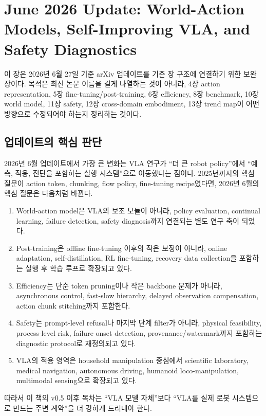 \chapter{June 2026 Update: World-Action Models, Self-Improving VLA, and Safety Diagnostics}
\label{ch:june_2026_update}

이 장은 2026년 6월 27일 기준 arXiv 업데이트를 기존 장 구조에 연결하기 위한 보완 장이다. 목적은 최신 논문 이름을 길게 나열하는 것이 아니라, 4장 action representation, 5장 fine-tuning/post-training, 6장 efficiency, 8장 benchmark, 10장 world model, 11장 safety, 12장 cross-domain embodiment, 13장 trend map이 어떤 방향으로 수정되어야 하는지 정리하는 것이다.

\section{업데이트의 핵심 판단}

2026년 6월 업데이트에서 가장 큰 변화는 VLA 연구가 ``더 큰 robot policy''에서 ``예측, 적응, 진단을 포함하는 실행 시스템''으로 이동했다는 점이다. 2025년까지의 핵심 질문이 action token, chunking, flow policy, fine-tuning recipe였다면, 2026년 6월의 핵심 질문은 다음처럼 바뀐다.

\begin{enumerate}
  \item World-action model은 VLA의 보조 모듈이 아니라, policy evaluation, continual learning, failure detection, safety diagnosis까지 연결되는 별도 연구 축이 되었다.
  \item Post-training은 offline fine-tuning 이후의 작은 보정이 아니라, online adaptation, self-distillation, RL fine-tuning, recovery data collection을 포함하는 실행 후 학습 루프로 확장되고 있다.
  \item Efficiency는 단순 token pruning이나 작은 backbone 문제가 아니라, asynchronous control, fast-slow hierarchy, delayed observation compensation, action chunk stitching까지 포함한다.
  \item Safety는 prompt-level refusal나 마지막 단계 filter가 아니라, physical feasibility, process-level risk, failure onset detection, provenance/watermark까지 포함하는 diagnostic protocol로 재정의되고 있다.
  \item VLA의 적용 영역은 household manipulation 중심에서 scientific laboratory, medical navigation, autonomous driving, humanoid loco-manipulation, multimodal sensing으로 확장되고 있다.
\end{enumerate}

따라서 이 책의 v0.5 이후 목차는 ``VLA 모델 자체''보다 ``VLA를 실제 로봇 시스템으로 만드는 주변 계약''을 더 강하게 드러내야 한다.

